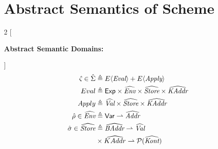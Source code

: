 \documentclass[12pt,draft]{article}
\begin{document}
\newcommand{\aenv}[0]{\hat{\rho}}
\newcommand{\astore}[0]{\hat{\sigma}}
\newcommand{\aval}[0]{\hat{v}}
\newcommand{\aclo}[0]{\widehat{clo}}
\newcommand{\abaddr}[0]{\hat{a}}
\newcommand{\akaddr}[0]{\hat{a}_{\hat{\kappa}}}
\newcommand{\aballoc}[1]{\widehat{balloc}(#1)}
\newcommand{\akalloc}[1]{\widehat{kalloc}(#1)}
\newcommand{\akont}[0]{\hat{\kappa}}
\newcommand{\ectrl}[0]{e_{\hat{\varsigma}}}
\newcommand{\adone}[0]{\widehat{done}}
\newcommand{\actrladdr}[0]{\hat{a}_{\kappa\varsigma}}
\newcommand{\actrlkont}[0]{\kappa_{\varsigma}}

\newpage
\section{Abstract Semantics of Scheme}

\begin{multicols*}{2}
  [
  \begin{center}
    \textbf{Abstract Semantic Domains:}
  \end{center}
  \vspace{-15mm}
  ]
  \begin{align*}
    \vspace{-10mm}
    \hat{\varsigma} \in \hat{\Sigma}
    &\triangleq E\langle \textit{Eval} \rangle + E\langle \textit{Apply} \rangle\\
    Eval &\triangleq \textsf{Exp}
           \times \widehat{\textit{Env}}
           \times \widehat{\textit{Store}}
           \times \widehat{\textit{KAddr}} \\
    Apply &\triangleq \widehat{\textit{Val}}
            \times \widehat{\textit{Store}} \times \widehat{\textit{KAddr}} \\
    \aenv \in \widehat{\textit{Env}}
    &\triangleq \textsf{Var} \rightharpoonup \widehat{\textit{Addr}} \\
    \astore \in \widehat{\textit{Store}}
    &\triangleq \widehat{\textit{BAddr}} \rightharpoonup \widehat{\textit{Val}} \\
    &\times \widehat{KAddr} \rightharpoonup \mathcal{P}(\widehat{\textit{Kont}}) \\

\end{align*}
\end{multicols*}
\end{document}
